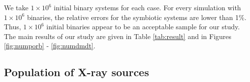\documentclass{elsart}
\begin{document}
 We take $1\times10^6$ initial binary systems for each case.
For every simulation with $1\times10^6$ binaries, the relative
errors for the symbiotic systems are lower than 1\%. Thus,
$1\times10^6$ initial binaries appear to be an acceptable sample for
our study. The main results of our study are given in Table
\ref{tab:result} and in Figures \ref{fig:numporb} -
\ref{fig:numdmdt}.

\subsection{Population of X-ray sources}

\end{document}

